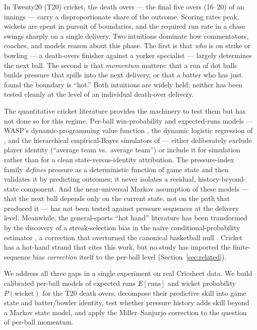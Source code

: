 In Twenty20 (T20) cricket, the death overs --- the final five overs (16--20) of
an innings --- carry a disproportionate share of the outcome. Scoring rates peak,
wickets are spent in pursuit of boundaries, and the required run rate in a chase
swings sharply on a single delivery. Two intuitions dominate how commentators,
coaches, and models reason about this phase. The first is that \emph{who} is on
strike or bowling --- a death-overs finisher against a yorker specialist ---
largely determines the next ball. The second is that \emph{momentum} matters:
that a run of dot balls builds pressure that spills into the next delivery, or
that a batter who has just found the boundary is ``hot.'' Both intuitions are
widely held; neither has been tested cleanly at the level of an individual
death-over delivery.

The quantitative cricket literature provides the machinery to test them but has
not done so for this regime. Per-ball win-probability and expected-runs models
--- WASP's dynamic-programming value function \citep{brooker2012wasp}, the
dynamic logistic regression of \citet{asif2016inplay}, and the hierarchical
empirical-Bayes simulators of \citet{swartz2016simulator, swartz2020xer} ---
either deliberately exclude player identity (``average team vs.\ average team'')
or include it for simulation rather than for a clean state-versus-identity
attribution. The pressure-index family \citep{shah2014pressure,
bhattacharjee2016quantifying, mallawa2024pressure} \emph{defines} pressure as a
deterministic function of game state and then validates it by predicting
outcomes; it never isolates a residual, history-beyond-state component. And the
near-universal Markov assumption of these models --- that the next ball depends
only on the current state, not on the path that produced it --- has not been
tested against pressure sequences at the delivery level. Meanwhile, the
general-sports ``hot hand'' literature has been transformed by the discovery of
a streak-selection bias in the naive conditional-probability estimator
\citep{miller2018surprised, miller2024coldshower}, a correction that overturned
the canonical basketball null \citep{gilovich1985hothand}. Cricket has a hot-hand
strand that cites this work, but no study has imported the finite-sequence bias
\emph{correction} itself to the per-ball level (Section~\ref{sec:related}).

We address all three gaps in a single experiment on real Cricsheet data. We
build calibrated per-ball models of expected runs $E[\text{runs}]$ and wicket
probability $P(\text{wicket})$ for the T20 death overs, decompose their
predictive skill into game state and batter/bowler identity, test whether
pressure history adds skill beyond a Markov state model, and apply the
Miller--Sanjurjo correction to the question of per-ball momentum.


